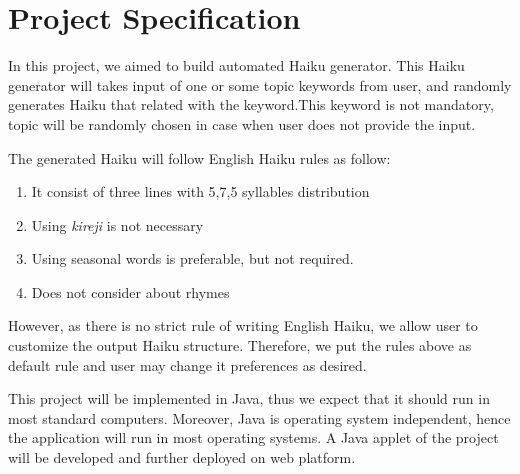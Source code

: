 \section{Project Specification}

In this project, we aimed to build automated Haiku generator. This Haiku generator will takes input of one or some topic keywords from user, and randomly generates Haiku that related with the keyword.This keyword is not mandatory, topic will be randomly chosen in case when user does not provide the input.

The generated Haiku will follow English Haiku rules as follow:
\begin{enumerate}
	\item It consist of three lines with 5,7,5 syllables distribution
	\item Using \textit{kireji} is not necessary
	\item Using seasonal words is preferable, but not required.
	\item Does not consider about rhymes
\end{enumerate}

However, as there is no strict rule of writing English Haiku, we allow user to customize the output Haiku structure. Therefore, we put the rules above as default rule and user may change it preferences as desired. 

This project will be implemented in Java, thus we expect that it should run in most standard computers. Moreover, Java is operating system independent, hence the application will run in most operating systems. A Java applet of the project will be developed and further deployed on web platform. 

